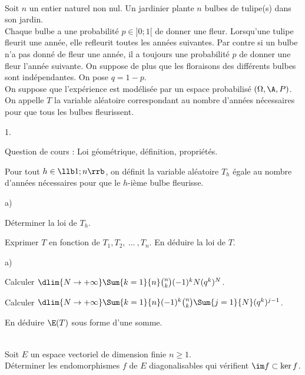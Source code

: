 \documentclass[11pt]{article}%
\begin{document}
\begin{exerciceAP}~\\
  Soit $n$ un entier naturel non nul. Un jardinier plante $n$ bulbes
  de tulipe(s) dans son jardin.\\
  Chaque bulbe a une probabilité $p \in ]0 ; 1[$ de donner une
  fleur. Lorsqu'une tulipe fleurit une année, elle refleurit toutes
  les années suivantes. Par contre si un bulbe n'a pas donné de fleur
  une année, il a toujours une probabilité $p$ de donner une fleur
  l'année suivante. On suppose de plus que les floraisons des
  différents bulbes sont indépendantes. On pose $q = 1-p$.
  \\[.2cm]
  On suppose que l'expérience est modélisée par un espace probabilisé
  $(\Omega , \A , P)$. \\
  On appelle $T$ la variable aléatoire correspondant au nombre
  d'années nécessaires pour que tous les bulbes fleurissent.
  \begin{noliste}{1.}
    \setlength{\itemsep}{2mm}
  \item Question de cours : Loi géométrique, définition, propriétés.
  \item Pour tout $h \in \llb 1 ; n \rrb$, on définit la variable
    aléatoire $T_h$ égale au nombre d'années nécessaires pour que le
    $h$-ième bulbe fleurisse. 
    \begin{noliste}{a)}
    \setlength{\itemsep}{2mm}
    \item Déterminer la loi de $T_h$.
    \item Exprimer $T$ en fonction de $T_1, T_2 ,\ \dots\ , T_n$. En
      déduire la loi de $T$.
    \end{noliste}
  \item \begin{noliste}{a)}
    \setlength{\itemsep}{2mm} 
    \item Calculer $\dlim{N \rightarrow +\infty} \Sum{k=1}{n}
      \binom{n}{k} (-1)^k N (q^k)^N$.
    \item Calculer $\dlim{N \rightarrow +\infty} \Sum{k=1}{n} (-1)^k
      \binom{n}{k} \Sum{j=1}{N} (q^k)^{j-1}$.
    \item En déduire $\E(T)$ sous forme d'une somme.
    \end{noliste}
  \end{noliste}
\end{exerciceAP}


\begin{exerciceSP}~\\
  Soit $E$ un espace vectoriel de dimension finie $n \geq 1$. \\
  Déterminer les endomorphismes $f$ de $E$ diagonalisables qui
  vérifient $\im f \subset \ker f$.
\end{exerciceSP}
\end{document}
